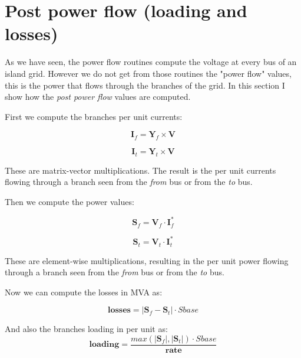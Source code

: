 \documentclass[11pt,fleqn]{book} %
\begin{document}
\newpage
\section{Post power flow (loading and losses)}

As we have seen, the power flow routines compute the voltage at every bus of an island grid. However we do not get from those routines the "power flow" values, this is the power that flows through the branches of the grid. In this section I show how the \textit{post power flow} values are computed. \newline


First we compute the branches per unit currents:

\begin{equation}
{\textbf{I}_f = \textbf{Y}_f \times \textbf{V}}
\end{equation}

\begin{equation}
{\textbf{I}_t = \textbf{Y}_t \times \textbf{V}}
\end{equation}


These are matrix-vector multiplications. The result is the per unit currents flowing through a branch seen from the \textit{from} bus or from the \textit{to} bus.


Then we compute the power values:

\begin{equation}
{\textbf{S}_f = \textbf{V}_f \cdot \textbf{I}_f^*}
\end{equation}

\begin{equation}
{\textbf{S}_t = \textbf{V}_t \cdot \textbf{I}_t^*}
\end{equation}

These are element-wise multiplications, resulting in the per unit power flowing through a branch seen from the \textit{from} bus or from the \textit{to} bus.

Now we can compute the losses in MVA as:

\begin{equation}
{\textbf{losses} = |\textbf{S}_f - \textbf{S}_t| \cdot Sbase}
\end{equation}

And also the branches loading in per unit as:
\begin{equation}
{\textbf{loading} = \frac{max(|\textbf{S}_f|, |\textbf{S}_t|) \cdot Sbase}{ \textbf{rate}}}
\end{equation}
\end{document}
